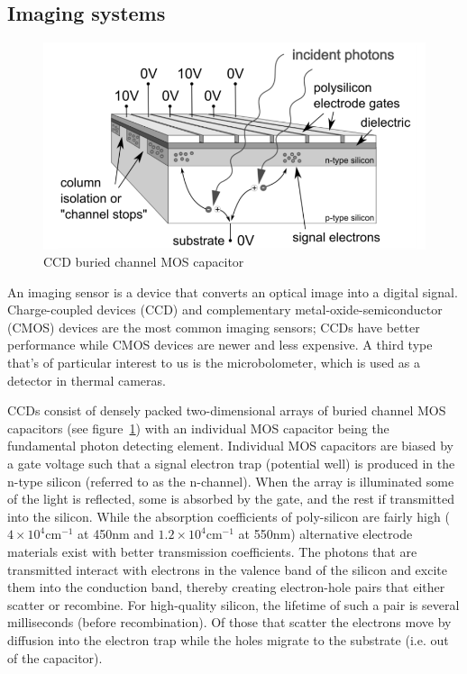\subsection{Imaging systems}\label{subsec:imaging-systems}
\begin{figure}
    \includegraphics[width=\linewidth,keepaspectratio]{figures/bccd.png}
    \caption{CCD buried channel MOS capacitor\cite{finaltestguideline}}
    \label{fig:mos-cap}
\end{figure}
An imaging sensor is a device that converts an optical image into a digital signal.
%
Charge-coupled devices (CCD) and complementary metal-oxide-semiconductor (CMOS) devices are the most common imaging sensors; CCDs have better performance while CMOS devices are newer and less expensive.
%
A third type that's of particular interest to us is the microbolometer, which is used as a detector in thermal cameras.

CCDs consist of densely packed two-dimensional arrays of buried channel MOS capacitors (see figure~\ref{fig:mos-cap}) with an individual MOS capacitor being the fundamental photon detecting element.
%
Individual MOS capacitors are biased by a gate voltage such that a signal electron trap (potential well) is produced in the n-type silicon (referred to as the n-channel).
%
When the array is illuminated some of the light is reflected, some is absorbed by the gate, and the rest if transmitted into the silicon.
%
While the absorption coefficients of poly-silicon are fairly high ($4\times 10^4\text{cm}^{-1}$ at 450nm and $1.2\times 10^4\text{cm}^{-1}$ at 550nm) alternative electrode materials exist with better transmission coefficients\cite{Bass:2009:HOT:1594759}.
%
The photons that are transmitted interact with electrons in the valence band of the silicon and excite them into the conduction band, thereby creating electron-hole pairs that either scatter or recombine.
%
For high-quality silicon, the lifetime of such a pair is several milliseconds (before recombination)\cite{scientificccd}.
%
Of those that scatter the electrons move by diffusion into the electron trap while the holes migrate to the substrate (i.e. out of the capacitor).


